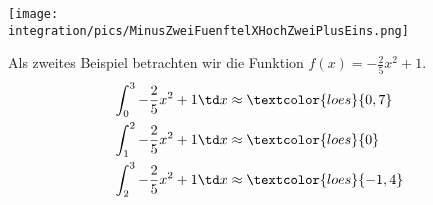 \begin{minipage}{\textwidth}
	\begin{minipage}{.36\textwidth}
		\texttt{[image: \\integration/pics/MinusZweiFuenftelXHochZweiPlusEins.png]}
	\end{minipage}
	\begin{minipage}{.59\textwidth}\raggedright
		Als zweites Beispiel betrachten wir die Funktion \(f(x)=-\frac{2}{5}x^2+1\).
		\begin{align*}
			\int_0^3 -\frac{2}{5}x^2+1\td x&\approx\textcolor{loes}{0,7}\\
			\int_1^2 -\frac{2}{5}x^2+1\td x&\approx\textcolor{loes}{0}\\
			\int_2^3 -\frac{2}{5}x^2+1\td x&\approx\textcolor{loes}{-1,4}
		\end{align*}
	\end{minipage}
\end{minipage}
\newpage
